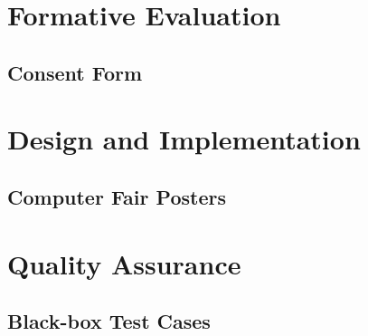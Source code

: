 \documentclass[12pt,a4paper]{article}
\begin{document}
\begin{appendices}
      \section{Formative Evaluation}
        \subsection{Consent Form}\label{appendix:consent-form}
          
          
      \section{Design and Implementation}
        \subsection{Computer Fair Posters}\label{appendix:computer-fair-posters}
          
          
          
        
      \section{Quality Assurance}
        \subsection{Black-box Test Cases}\label{appendix:black-box-test-cases}
        
    \end{appendices}

  
\end{document}
